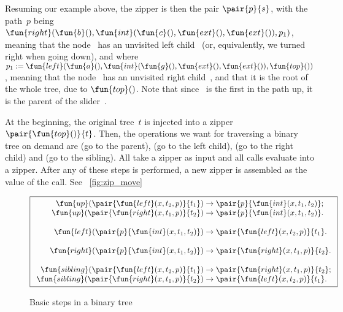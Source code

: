 Resuming our example above, the zipper is then the pair
\(\pair{p}{s}\), with the path~\(p\) being \(\fun{right}(\fun{b}(),
\fun{int}(\fun{c}(), \fun{ext}(), \fun{ext}()),p_1)\), meaning that
the node ~has an unvisited left child~ (or,
equivalently, we turned right when going down), and where \(p_1 :=
\fun{left}(\fun{a}(), \fun{int}(\fun{g}(), \fun{ext}(), \fun{ext}()),
\fun{top}())\), meaning that the node~ has an unvisited right
child~, and that it is the root of the whole tree, due to
\(\fun{top}()\). Note that since ~is the first in the path up,
it is the parent of the slider~.

At the beginning, the original tree~\(t\) is injected into a zipper
\(\pair{\fun{top}()}{t}\). Then, the operations we want for traversing
a binary tree on demand are  (go to the
parent),  (go to the left child),
 (go to the right child) and
 (go to the
sibling). All take a zipper as input and all calls evaluate into a
zipper. After any of these steps is performed, a new
zipper is assembled as the value of the
call. See \fig~\vref{fig:zip_move}
\begin{figure}
\begin{equation*}
\boxed{
\begin{array}{r@{\;}c@{\;}l}
\fun{up}(\pair{\fun{left}(x,t_2,p)}{t_1}) & \rightarrow &
  \pair{p}{\fun{int}(x,t_1,t_2)};\\
\fun{up}(\pair{\fun{right}(x,t_1,p)}{t_2}) & \rightarrow &
\pair{p}{\fun{int}(x,t_1,t_2)}.\\
\\
\fun{left}(\pair{p}{\fun{int}(x,t_1,t_2)}) & \rightarrow &
  \pair{\fun{left}(x,t_2,p)}{t_1}.\\
\\
\fun{right}(\pair{p}{\fun{int}(x,t_1,t_2)}) & \rightarrow &
  \pair{\fun{right}(x,t_1,p)}{t_2}.\\
\\
\fun{sibling}(\pair{\fun{left}(x,t_2,p)}{t_1}) & \rightarrow &
  \pair{\fun{right}(x,t_1,p)}{t_2};\\
\fun{sibling}(\pair{\fun{right}(x,t_1,p)}{t_2}) & \rightarrow &
  \pair{\fun{left}(x,t_2,p)}{t_1}.
\end{array}}
\end{equation*}
\caption{Basic steps in a binary tree}
\label{fig:zip_move}
\end{figure}
